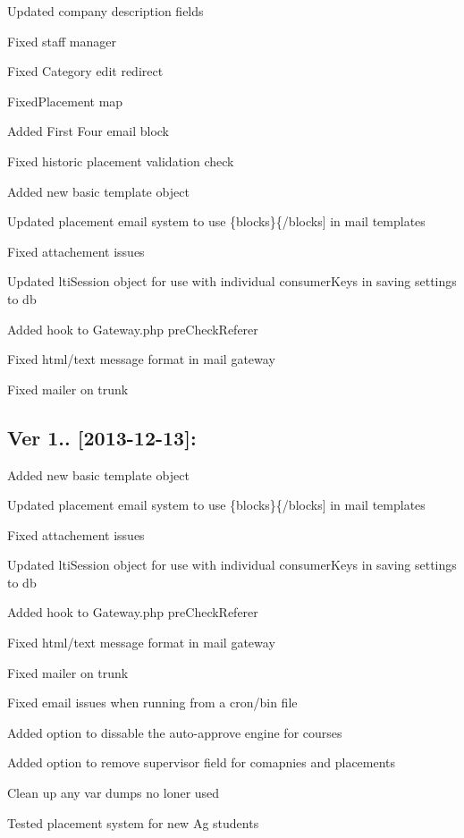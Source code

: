 \begin{DoxyItemize}
\item Updated company description fields
\item Fixed staff manager
\item Fixed Category edit redirect
\item Fixed\+Placement map
\item Added First Four email block
\item Fixed historic placement validation check
\item Added new basic template object
\item Updated placement email system to use \{blocks\}\{/blocks\mbox{]} in mail templates
\item Fixed attachement issues
\item Updated lti\+Session object for use with individual consumer\+Keys in saving settings to db
\item Added hook to Gateway.\+php pre\+Check\+Referer
\item Fixed html/text message format in mail gateway
\item Fixed mailer on trunk
\end{DoxyItemize}

\subsection*{Ver 1.. \mbox{[}2013-\/12-\/13\mbox{]}\+: }


\begin{DoxyItemize}
\item Added new basic template object
\item Updated placement email system to use \{blocks\}\{/blocks\mbox{]} in mail templates
\item Fixed attachement issues
\item Updated lti\+Session object for use with individual consumer\+Keys in saving settings to db
\item Added hook to Gateway.\+php pre\+Check\+Referer
\item Fixed html/text message format in mail gateway
\item Fixed mailer on trunk
\item Fixed email issues when running from a cron/bin file
\item Added option to dissable the auto-\/approve engine for courses
\item Added option to remove supervisor field for comapnies and placements
\item Clean up any var dumps no loner used
\item Tested placement system for new Ag students
\end{DoxyItemize}

